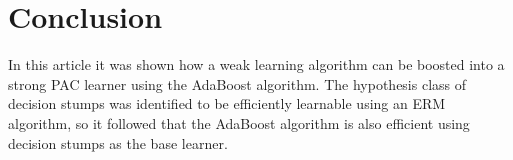 \section{Conclusion}
\label{conclusion}

In this article it was shown how a weak learning algorithm can be boosted into a strong PAC learner using the
AdaBoost algorithm.
The hypothesis class of decision stumps was identified to be efficiently learnable using an ERM algorithm, so
it followed that the AdaBoost algorithm is also efficient using decision stumps as the base learner.
